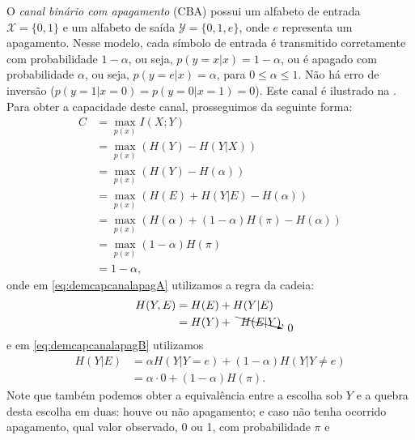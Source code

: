 O \emph{canal binário com apagamento} (CBA) possui um alfabeto de entrada 
$\mathcal{X} = \{0, 1\}$ e um alfabeto de saída $\mathcal{Y} = \{0, 1, e\}$, 
onde $e$ representa um apagamento. Nesse modelo, cada símbolo de entrada é transmitido corretamente
com probabilidade $1-\alpha$, ou seja, $p(y=x|x) = 1-\alpha$, ou é apagado com
probabilidade $\alpha$, ou seja, $p(y=e|x) = \alpha$, para $0 \leq \alpha \leq 1$. 
Não há erro de inversão ($p(y=1|x=0) = p(y=0|x=1) = 0$).
Este canal é ilustrado na .
Para obter a capacidade deste canal, prosseguimos da seguinte forma:
\begin{subequations}\label{eq:capcanalapagamento}
  \begin{align}
    C &= \max_{p(x)} I(X;Y) \\ 
      &= \max_{p(x)} \left(H(Y) - H(Y|X)\right) \\
      &= \max_{p(x)} \left(H(Y) - H(\alpha)\right) \\
      &= \max_{p(x)} \left(H(E) + H(Y|E) - H(\alpha)\right) \label{eq:demcapcanalapagA}\\
      &= \max_{p(x)} \left(H(\alpha) + (1 - \alpha) H(\pi) - H(\alpha)\right) \label{eq:demcapcanalapagB}\\ 
      &= \max_{p(x)} (1 - \alpha) H(\pi) \label{eq:demcapcanalapagC} \\
      &= 1 - \alpha ,
  \end{align}
\end{subequations}
onde em \ref{eq:demcapcanalapagA} utilizamos a regra da cadeia:
\begin{subequations}
  \begin{align}
    H(Y,E) &= H(E) + H(Y|E) \\
           &= H(Y) + \bcancelto{0}{H(E|Y)} ,
  \end{align}
\end{subequations}
e em \ref{eq:demcapcanalapagB} utilizamos
\begin{subequations}
  \begin{align}
    H(Y|E) &= \alpha H(Y|Y=e) + (1-\alpha) H(Y|Y\neq e) \\
           &= \alpha \cdot 0 + (1-\alpha) H(\pi) .
  \end{align}
\end{subequations}
Note que também podemos obter a equivalência entre a escolha sob $Y$ 
e a quebra desta escolha em duas: houve ou não apagamento; e caso não tenha
ocorrido apagamento, qual valor observado, 0 ou 1, com probabilidade $\pi$ e
